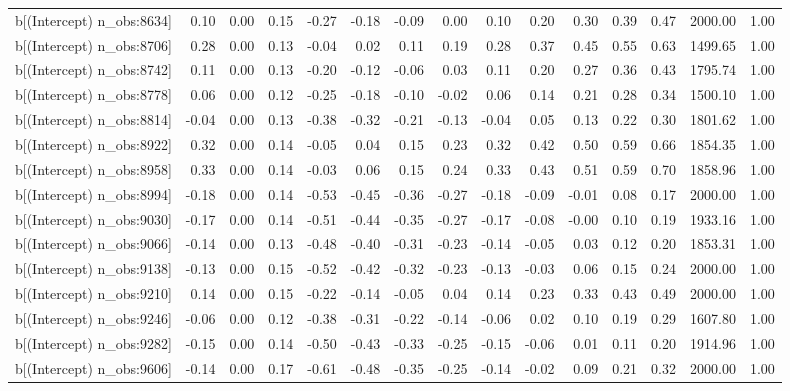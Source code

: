 \begin{table}[ht]
\begin{tabular}{rrrrrrrrrrrrrrr}
  b[(Intercept) n\_obs:8634] & 0.10 & 0.00 & 0.15 & -0.27 & -0.18 & -0.09 & 0.00 & 0.10 & 0.20 & 0.30 & 0.39 & 0.47 & 2000.00 & 1.00 \\ 
  b[(Intercept) n\_obs:8706] & 0.28 & 0.00 & 0.13 & -0.04 & 0.02 & 0.11 & 0.19 & 0.28 & 0.37 & 0.45 & 0.55 & 0.63 & 1499.65 & 1.00 \\ 
  b[(Intercept) n\_obs:8742] & 0.11 & 0.00 & 0.13 & -0.20 & -0.12 & -0.06 & 0.03 & 0.11 & 0.20 & 0.27 & 0.36 & 0.43 & 1795.74 & 1.00 \\ 
  b[(Intercept) n\_obs:8778] & 0.06 & 0.00 & 0.12 & -0.25 & -0.18 & -0.10 & -0.02 & 0.06 & 0.14 & 0.21 & 0.28 & 0.34 & 1500.10 & 1.00 \\ 
  b[(Intercept) n\_obs:8814] & -0.04 & 0.00 & 0.13 & -0.38 & -0.32 & -0.21 & -0.13 & -0.04 & 0.05 & 0.13 & 0.22 & 0.30 & 1801.62 & 1.00 \\ 
  b[(Intercept) n\_obs:8922] & 0.32 & 0.00 & 0.14 & -0.05 & 0.04 & 0.15 & 0.23 & 0.32 & 0.42 & 0.50 & 0.59 & 0.66 & 1854.35 & 1.00 \\ 
  b[(Intercept) n\_obs:8958] & 0.33 & 0.00 & 0.14 & -0.03 & 0.06 & 0.15 & 0.24 & 0.33 & 0.43 & 0.51 & 0.59 & 0.70 & 1858.96 & 1.00 \\ 
  b[(Intercept) n\_obs:8994] & -0.18 & 0.00 & 0.14 & -0.53 & -0.45 & -0.36 & -0.27 & -0.18 & -0.09 & -0.01 & 0.08 & 0.17 & 2000.00 & 1.00 \\ 
  b[(Intercept) n\_obs:9030] & -0.17 & 0.00 & 0.14 & -0.51 & -0.44 & -0.35 & -0.27 & -0.17 & -0.08 & -0.00 & 0.10 & 0.19 & 1933.16 & 1.00 \\ 
  b[(Intercept) n\_obs:9066] & -0.14 & 0.00 & 0.13 & -0.48 & -0.40 & -0.31 & -0.23 & -0.14 & -0.05 & 0.03 & 0.12 & 0.20 & 1853.31 & 1.00 \\ 
  b[(Intercept) n\_obs:9138] & -0.13 & 0.00 & 0.15 & -0.52 & -0.42 & -0.32 & -0.23 & -0.13 & -0.03 & 0.06 & 0.15 & 0.24 & 2000.00 & 1.00 \\ 
  b[(Intercept) n\_obs:9210] & 0.14 & 0.00 & 0.15 & -0.22 & -0.14 & -0.05 & 0.04 & 0.14 & 0.23 & 0.33 & 0.43 & 0.49 & 2000.00 & 1.00 \\ 
  b[(Intercept) n\_obs:9246] & -0.06 & 0.00 & 0.12 & -0.38 & -0.31 & -0.22 & -0.14 & -0.06 & 0.02 & 0.10 & 0.19 & 0.29 & 1607.80 & 1.00 \\ 
  b[(Intercept) n\_obs:9282] & -0.15 & 0.00 & 0.14 & -0.50 & -0.43 & -0.33 & -0.25 & -0.15 & -0.06 & 0.01 & 0.11 & 0.20 & 1914.96 & 1.00 \\ 
  b[(Intercept) n\_obs:9606] & -0.14 & 0.00 & 0.17 & -0.61 & -0.48 & -0.35 & -0.25 & -0.14 & -0.02 & 0.09 & 0.21 & 0.32 & 2000.00 & 1.00 \\ 

\end{tabular}
\end{table}
